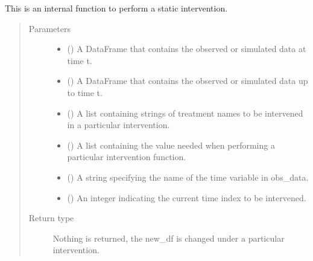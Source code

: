 \documentclass[letterpaper,10pt,english]{sphinxmanual}
\begin{document}
\begin{fulllineitems}
\label{\detokenize{Specifications/Interventions:pygformula.parametric_gformula.interventions.static}}
\sphinxAtStartPar
This is an internal function to perform a static intervention.
\begin{quote}\begin{description}
\item[{Parameters}] \leavevmode\begin{itemize}
\item {} 
\sphinxAtStartPar
{} () \textendash{} A DataFrame that contains the observed or simulated data at time t.

\item {} 
\sphinxAtStartPar
{} () \textendash{} A DataFrame that contains the observed or simulated data up to time t.

\item {} 
\sphinxAtStartPar
{} () \textendash{} A list containing strings of treatment names to be intervened in a particular intervention.

\item {} 
\sphinxAtStartPar
{} () \textendash{} A list containing the value needed when performing a particular intervention function.

\item {} 
\sphinxAtStartPar
{} () \textendash{} A string specifying the name of the time variable in obs\_data.

\item {} 
\sphinxAtStartPar
{} () \textendash{} An integer indicating the current time index to be intervened.

\end{itemize}

\item[{Return type}] \leavevmode
\sphinxAtStartPar
Nothing is returned, the new\_df is changed under a particular intervention.

\end{description}\end{quote}

\end{fulllineitems}
\end{document}
